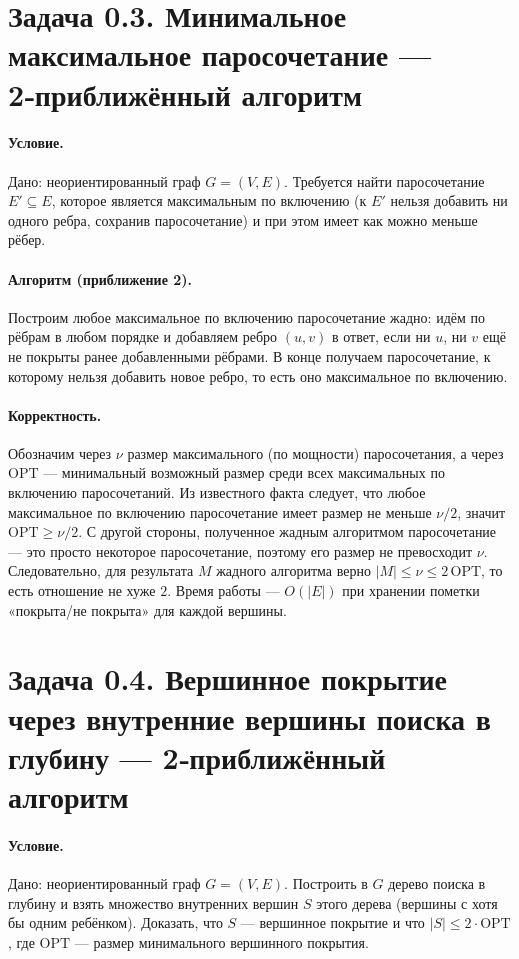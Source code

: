 \documentclass[12pt]{article}
\begin{document}
  \section*{Задача 0.3. Минимальное максимальное паросочетание — 2‑приближённый алгоритм}

  \paragraph{Условие.}
  Дано: неориентированный граф $G=(V,E)$. Требуется найти паросочетание $E'\subseteq E$, которое является максимальным по включению (к $E'$ нельзя добавить ни одного ребра, сохранив паросочетание) и при этом имеет как можно меньше рёбер.

  \paragraph{Алгоритм (приближение 2).}
  Построим любое максимальное по включению паросочетание жадно: идём по рёбрам в любом порядке и добавляем ребро $(u,v)$ в ответ, если ни $u$, ни $v$ ещё не покрыты ранее добавленными рёбрами. В конце получаем паросочетание, к которому нельзя добавить новое ребро, то есть оно максимальное по включению.

  \paragraph{Корректность.}
  Обозначим через $\nu$ размер максимального (по мощности) паросочетания, а через $\text{OPT}$ — минимальный возможный размер среди всех максимальных по включению паросочетаний. Из известного факта следует, что любое максимальное по включению паросочетание имеет размер не меньше $\nu/2$, значит $\text{OPT}\ge \nu/2$. С другой стороны, полученное жадным алгоритмом паросочетание — это просто некоторое паросочетание, поэтому его размер не превосходит $\nu$. Следовательно, для результата $M$ жадного алгоритма верно $|M|\le \nu\le 2\,\text{OPT}$, то есть отношение не хуже $2$. Время работы — $O(|E|)$ при хранении пометки «покрыта/не покрыта» для каждой вершины.


  \section*{Задача 0.4. Вершинное покрытие через внутренние вершины поиска в глубину — 2‑приближённый алгоритм}

  \paragraph{Условие.}
  Дано: неориентированный граф $G=(V,E)$. Построить в $G$ дерево поиска в глубину и взять множество внутренних вершин $S$ этого дерева (вершины с хотя бы одним ребёнком). Доказать, что $S$ — вершинное покрытие и что $|S|\le 2\cdot \mathrm{OPT}$, где $\mathrm{OPT}$ — размер минимального вершинного покрытия.
\end{document}
